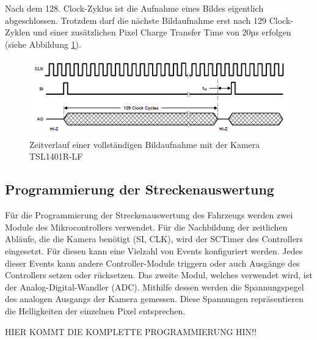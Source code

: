 Nach dem 128. Clock-Zyklus ist die Aufnahme eines Bildes eigentlich abgeschlossen. Trotzdem darf die nächste Bildaufnahme erst nach 129 Clock-Zyklen und einer zusätzlichen \glqq{}Pixel Charge Transfer Time\grqq{} von 20µs erfolgen (siehe Abbildung \ref{fig:TimingWaveform}).

\begin{figure}[H] %
\includegraphics[width=.95\textwidth]{sec7/images/TimingWaveform} 
\centering
\captionsetup{width=.95\textwidth}
\caption[Zeitverlauf einer vollständigen Bildaufnahme (TSL1401R-LF) ~\protect\cite{Taos}]{Zeitverlauf einer vollständigen Bildaufnahme mit der Kamera TSL1401R-LF ~\protect\cite{Taos}}\centering
\label{fig:TimingWaveform}
\end{figure}

\subsection{Programmierung der Streckenauswertung}\label{Sec7Sub3}

Für die Programmierung der Streckenauswertung des Fahrzeugs werden zwei Module des Mikrocontrollers verwendet. Für die Nachbildung der zeitlichen Abläufe, die die Kamera benötigt (SI, CLK), wird der SCTimer des Controllers eingesetzt. Für diesen kann eine Vielzahl von Events konfiguriert werden. Jedes dieser Events kann andere Controller-Module triggern oder auch Ausgänge des Controllers setzen oder rücksetzen. Das zweite Modul, welches verwendet wird, ist der Analog-Digital-Wandler (ADC). Mithilfe dessen werden die Spannungspegel des analogen Ausgangs der Kamera gemessen. Diese Spannungen repräsentieren die Helligkeiten der einzelnen Pixel entsprechen.\vspace{11pt}



HIER KOMMT DIE KOMPLETTE PROGRAMMIERUNG HIN!!\vspace{11pt}


